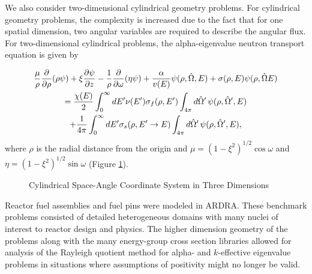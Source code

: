 We also consider two-dimensional cylindrical geometry problems. For cylindrical geometry problems, the complexity is increased due to the fact that for one spatial dimension, two angular variables are required to describe the angular flux. For two-dimensional cylindrical problems, the alpha-eigenvalue neutron transport equation is given by 

\begin{multline}
\frac{\mu}{\rho} \frac{\partial}{\partial \rho} (\rho \psi) + \xi \frac{\partial \psi}{\partial z} - \frac{1}{\rho} \frac{\partial}{\partial \omega} (\eta \psi) + \frac{\alpha}{v(E)} \psi(\rho,\hat{\Omega},E) + \sigma(\rho,E) \psi(\rho,\hat{\Omega}E) \\ = \frac{\chi(E)}{2} \int_{0}^{\infty} \mathop{}\!d E' \nu(E') \sigma_{f}(\rho,E') \int_{4\pi} \mathop{}\!d \hat{\Omega}' \, \psi(\rho, \hat{\Omega}',E) \\ + \frac{1}{4\pi} \int_{0}^{\infty} \mathop{}\!d E' \sigma_{s}(\rho, E' \rightarrow E) \int_{4\pi} \mathop{}\!d \hat{\Omega}' \, \psi(\rho, \hat{\Omega}',E),
\label{eq:2DCylAlpha}
\end{multline}
where $\rho$ is the radial distance from the origin and $\mu = (1-\xi^{2})^{1/2} \cos \omega$ and $\eta = (1-\xi^{2})^{1/2}\sin \omega$ (Figure \ref{fig:Cyl2D}).

\begin{figure}[!htbp]
\centering
\resizebox{0.55\textwidth}{!}{
	
%	
	}
	\caption{Cylindrical Space-Angle Coordinate System in Three Dimensions}
	\label{fig:Cyl2D}
\end{figure}

Reactor fuel assemblies and fuel pins were modeled in ARDRA. These benchmark problems consisted of detailed heterogeneous domains with many nuclei of interest to reactor design and physics. The higher dimension geometry of the problems along with the many energy-group cross section libraries allowed for analysis of the Rayleigh quotient method for alpha- and $k$-effective eigenvalue problems in situations where assumptions of positivity might no longer be valid.

